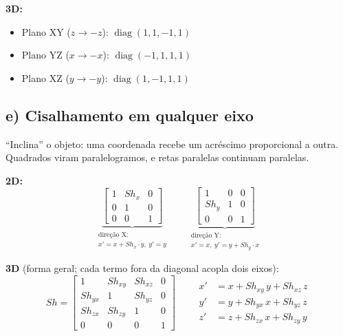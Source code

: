 \documentclass{article}
\begin{document}
\textbf{3D:}
\begin{itemize}
      \item Plano XY ($z \to -z$): $\operatorname{diag}(1, 1, -1, 1)$
      \item Plano YZ ($x \to -x$): $\operatorname{diag}(-1, 1, 1, 1)$
      \item Plano XZ ($y \to -y$): $\operatorname{diag}(1, -1, 1, 1)$
\end{itemize}

\subsection*{e) Cisalhamento em qualquer eixo}

``Inclina'' o objeto: uma coordenada recebe um acréscimo proporcional a outra. Quadrados viram paralelogramos, e retas paralelas continuam paralelas.

\textbf{2D:}
\[
      \underbrace{\begin{bmatrix} 1 & Sh_x & 0 \\ 0 & 1 & 0 \\ 0 & 0 & 1 \end{bmatrix}}_{\substack{\text{direção X:}\\ x' = x + Sh_x \cdot y,\ y' = y}}
      \qquad
      \underbrace{\begin{bmatrix} 1 & 0 & 0 \\ Sh_y & 1 & 0 \\ 0 & 0 & 1 \end{bmatrix}}_{\substack{\text{direção Y:}\\ x' = x,\ y' = y + Sh_y \cdot x}}
\]

\textbf{3D} (forma geral; cada termo fora da diagonal acopla dois eixos):
\[
      Sh =
      \begin{bmatrix}
            1       & Sh_{xy} & Sh_{xz} & 0 \\
            Sh_{yx} & 1       & Sh_{yz} & 0 \\
            Sh_{zx} & Sh_{zy} & 1       & 0 \\
            0       & 0       & 0       & 1
      \end{bmatrix}
      \qquad
      \begin{aligned}
            x' &= x + Sh_{xy}\, y + Sh_{xz}\, z \\
            y' &= y + Sh_{yx}\, x + Sh_{yz}\, z \\
            z' &= z + Sh_{zx}\, x + Sh_{zy}\, y
      \end{aligned}
\]
\end{document}
